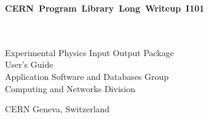 
 
\begin{titlepage}
\notHTML{\vspace*{-23mm}}%
%
%
\hfill
{}\hbox{\Large\bf CERN Program Library Long Writeup I101}
\hfill\mbox{}
\begin{center}
\mbox{}\\[10mm]
\mbox{}\\[2cm]
{\LARGE Experimental Physics Input Output Package}\\[2cm]
{\LARGE User's Guide}\\[3cm]
{\Large Application Software and Databases Group}\\[1cm]
{\Large Computing and Networks Division}\\[2cm]
\end{center}
\notHTML{\vfill}%
\begin{center}\Large CERN Geneva, Switzerland\end{center}
\end{titlepage}

